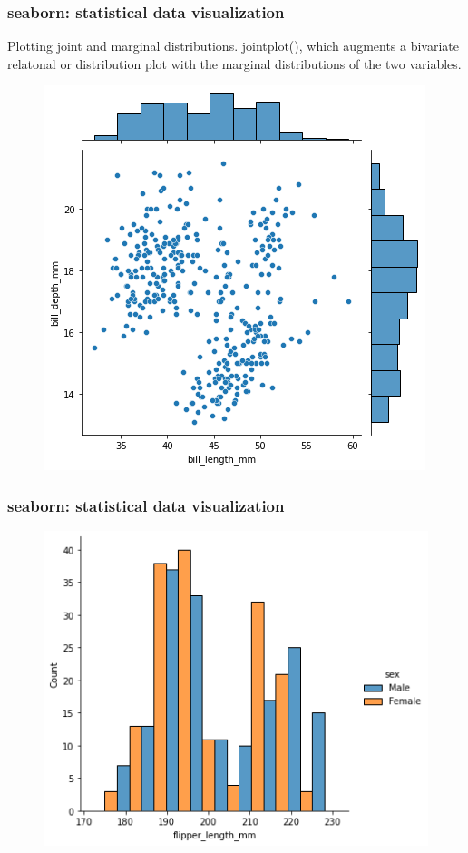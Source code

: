 \documentclass{beamer}
\begin{document}
\begin{frame}[fragile] %
\frametitle{seaborn: statistical data visualization}


\begin{example} 
Plotting joint and marginal distributions. jointplot(), which augments a bivariate relatonal or distribution plot with the marginal distributions of the two variables. 

\end{example}

\begin{figure}
\includegraphics[width=0.4\linewidth]{Seminar_3_images/Python/04.png}
\end{figure}

\end{frame}

\begin{frame}[fragile] %
\frametitle{seaborn: statistical data visualization}


\begin{example} 


\end{example}

\begin{figure}
\includegraphics[width=0.6\linewidth]{Seminar_3_images/Python/05.png}
\end{figure}

\end{frame}
\end{document}
